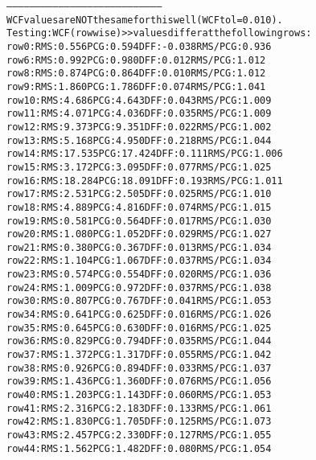 \begin{alltt}
--------------------------------------------------------------------------------
WCF values are NOT the same for this well (WCF tol = 0.010).
Testing: WCF (rowwise) >> values differ at the following rows:
row   0:  RMS:   0.556    PCG:   0.594    DFF:  -0.038    RMS/PCG:   0.936    
row   6:  RMS:   0.992    PCG:   0.980    DFF:   0.012    RMS/PCG:   1.012    
row   8:  RMS:   0.874    PCG:   0.864    DFF:   0.010    RMS/PCG:   1.012    
row   9:  RMS:   1.860    PCG:   1.786    DFF:   0.074    RMS/PCG:   1.041    
row  10:  RMS:   4.686    PCG:   4.643    DFF:   0.043    RMS/PCG:   1.009    
row  11:  RMS:   4.071    PCG:   4.036    DFF:   0.035    RMS/PCG:   1.009    
row  12:  RMS:   9.373    PCG:   9.351    DFF:   0.022    RMS/PCG:   1.002    
row  13:  RMS:   5.168    PCG:   4.950    DFF:   0.218    RMS/PCG:   1.044    
row  14:  RMS:  17.535    PCG:  17.424    DFF:   0.111    RMS/PCG:   1.006    
row  15:  RMS:   3.172    PCG:   3.095    DFF:   0.077    RMS/PCG:   1.025    
row  16:  RMS:  18.284    PCG:  18.091    DFF:   0.193    RMS/PCG:   1.011    
row  17:  RMS:   2.531    PCG:   2.505    DFF:   0.025    RMS/PCG:   1.010    
row  18:  RMS:   4.889    PCG:   4.816    DFF:   0.074    RMS/PCG:   1.015    
row  19:  RMS:   0.581    PCG:   0.564    DFF:   0.017    RMS/PCG:   1.030    
row  20:  RMS:   1.080    PCG:   1.052    DFF:   0.029    RMS/PCG:   1.027    
row  21:  RMS:   0.380    PCG:   0.367    DFF:   0.013    RMS/PCG:   1.034    
row  22:  RMS:   1.104    PCG:   1.067    DFF:   0.037    RMS/PCG:   1.034    
row  23:  RMS:   0.574    PCG:   0.554    DFF:   0.020    RMS/PCG:   1.036    
row  24:  RMS:   1.009    PCG:   0.972    DFF:   0.037    RMS/PCG:   1.038    
row  30:  RMS:   0.807    PCG:   0.767    DFF:   0.041    RMS/PCG:   1.053    
row  34:  RMS:   0.641    PCG:   0.625    DFF:   0.016    RMS/PCG:   1.026    
row  35:  RMS:   0.645    PCG:   0.630    DFF:   0.016    RMS/PCG:   1.025    
row  36:  RMS:   0.829    PCG:   0.794    DFF:   0.035    RMS/PCG:   1.044    
row  37:  RMS:   1.372    PCG:   1.317    DFF:   0.055    RMS/PCG:   1.042    
row  38:  RMS:   0.926    PCG:   0.894    DFF:   0.033    RMS/PCG:   1.037    
row  39:  RMS:   1.436    PCG:   1.360    DFF:   0.076    RMS/PCG:   1.056    
row  40:  RMS:   1.203    PCG:   1.143    DFF:   0.060    RMS/PCG:   1.053    
row  41:  RMS:   2.316    PCG:   2.183    DFF:   0.133    RMS/PCG:   1.061    
row  42:  RMS:   1.830    PCG:   1.705    DFF:   0.125    RMS/PCG:   1.073    
row  43:  RMS:   2.457    PCG:   2.330    DFF:   0.127    RMS/PCG:   1.055    
row  44:  RMS:   1.562    PCG:   1.482    DFF:   0.080    RMS/PCG:   1.054    

\end{alltt}
